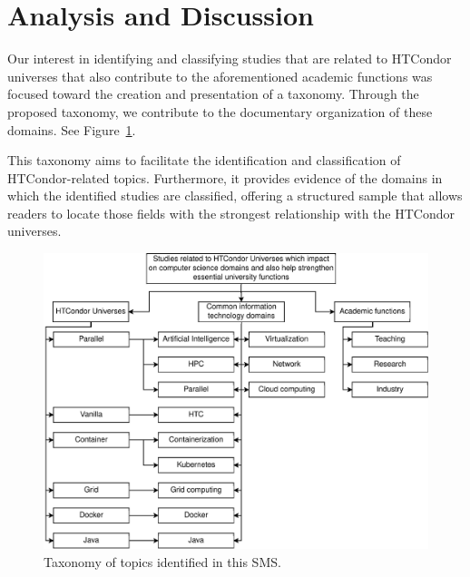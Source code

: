 \section{Analysis and Discussion}\label{sec:analisis-discusion}

Our interest in identifying and classifying studies that are related to HTCondor universes that also contribute to the aforementioned academic functions was focused toward the creation and presentation of a taxonomy. Through the proposed taxonomy, we contribute to the documentary organization of these domains. See Figure~\ref{fig:taxonomia}.

This taxonomy aims to facilitate the identification and classification of HTCondor-related topics. Furthermore, it provides evidence of the domains in which the identified studies are classified, offering a structured sample that allows readers to locate those fields with the strongest relationship with the HTCondor universes.

\begin{figure}
	\centering
	\includegraphics[scale=0.6]{resources/figures/sms-taxonomia.eps}
	\caption{Taxonomy of topics identified in this SMS.}
	\label{fig:taxonomia}
\end{figure}
